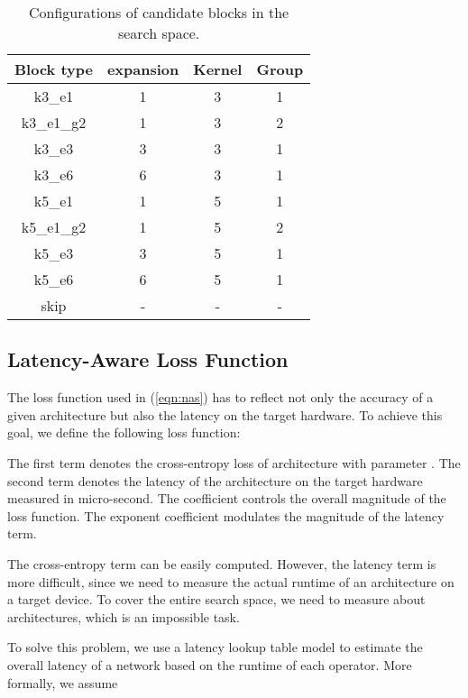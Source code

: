 \documentclass[10pt,twocolumn,letterpaper]{article}
\begin{document}
\begin{table}[]
\centering
\begin{tabular}{c|c|c|c}
\hline
Block type & expansion      & Kernel      & Group \\ \hline
k3\_e1     & 1              & 3           & 1     \\
k3\_e1\_g2 & 1              & 3           & 2     \\
k3\_e3     & 3              & 3           & 1     \\
k3\_e6     & 6              & 3           & 1     \\
k5\_e1     & 1              & 5           & 1     \\
k5\_e1\_g2 & 1              & 5           & 2     \\
k5\_e3     & 3              & 5           & 1     \\
k5\_e6     & 6              & 5           & 1     \\ 
skip       & -              & -           & -     \\ \hline
\end{tabular}
\caption{Configurations of candidate blocks in the search space.}
\label{tab:micro-space}
\end{table}

\subsection{Latency-Aware Loss Function}
\label{sec:loss_function}
The loss function used in (\ref{eqn:nas}) has to reflect not only the accuracy of a given architecture but also the latency on the target hardware. To achieve this goal, we define the following loss function:

The first term  denotes the cross-entropy loss of architecture  with parameter . The second term  denotes the latency of the architecture on the target hardware measured in micro-second. The coefficient  controls the overall magnitude of the loss function. The exponent coefficient  modulates the magnitude of the latency term. 

The cross-entropy term can be easily computed. However, the latency term is more difficult, since we need to measure the actual runtime of an architecture on a target device. To cover the entire search space, we need to measure about  architectures, which is an impossible task. 

To solve this problem, we use a latency lookup table model to estimate the overall latency of a network based on the runtime of each operator. More formally, we assume
\end{document}
